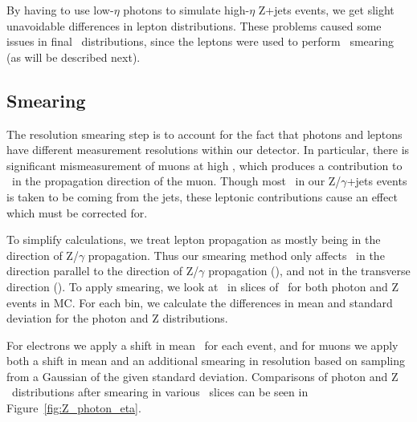By having to use low-$\eta$ photons to simulate high-$\eta$ Z+jets events, we get slight unavoidable differences in lepton distributions. These problems caused some issues in final \MET\ distributions, since the leptons were used to perform \MET\ smearing (as will be described next).

\subsection*{Smearing}

The resolution smearing step is to account for the fact that photons and leptons have different measurement resolutions within our detector. In particular, there is significant mismeasurement of muons at high \pt, which produces a contribution to \MET\ in the propagation direction of the muon. Though most \MET\ in our Z/$\gamma$+jets events is taken to be coming from the jets, these leptonic contributions cause an effect which must be corrected for.

To simplify calculations, we treat lepton propagation as mostly being in the direction of Z/$\gamma$ propagation. Thus our smearing method only affects \MET\ in the direction parallel to the direction of Z/$\gamma$ propagation (\METl), and not in the transverse direction (\METt). To apply smearing, we look at \METl\ in slices of \pt\ for both photon and Z events in MC. For each bin, we calculate the differences in mean and standard deviation for the photon and Z distributions.

For electrons we apply a shift in mean \METl\ for each event, and for muons we apply both a shift in mean and an additional smearing in resolution based on sampling from a Gaussian of the given standard deviation. Comparisons of photon and Z \METl\ distributions after smearing in various \pt\ slices can be seen in Figure~\ref{fig:Z_photon_eta}.

